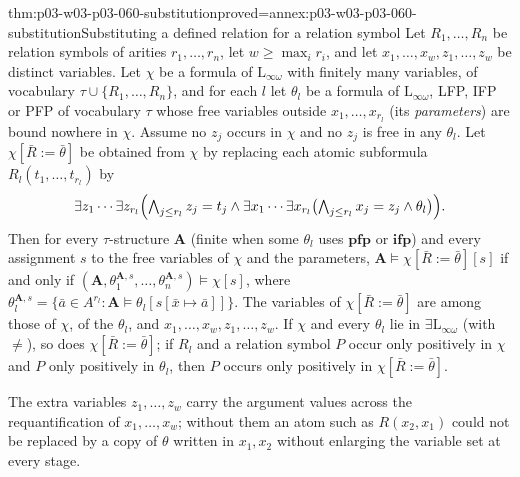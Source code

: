 \begin{hblemma}{thm:p03-w03-p03-060-substitution}{proved=annex:p03-w03-p03-060-substitution}{Substituting a defined relation for a relation symbol}
Let \(R_1,\ldots,R_n\) be relation symbols of arities \(r_1,\ldots,r_n\), let
\(w\ge\max_ir_i\), and let \(x_1,\ldots,x_w,z_1,\ldots,z_w\) be distinct
variables. Let \(\chi\) be a formula of \(\mathrm{L}_{\infty\omega}\) with
finitely many variables, of vocabulary \(\tau\cup\{R_1,\ldots,R_n\}\), and
for each \(l\) let \(\theta_l\) be a formula of \(\mathrm{L}_{\infty\omega}\),
LFP, IFP or PFP of vocabulary \(\tau\) whose free variables outside
\(x_1,\ldots,x_{r_l}\) (its \emph{parameters}) are bound nowhere in
\(\chi\). Assume no \(z_j\) occurs in \(\chi\) and no \(z_j\) is free in
any \(\theta_l\).
Let \(\chi[\bar R:=\bar\theta]\) be obtained from \(\chi\) by replacing each
atomic subformula \(R_l(t_1,\ldots,t_{r_l})\) by
\[
 \exists z_1\cdots\exists z_{r_l}\Bigl(\textstyle\bigwedge_{j\le r_l}z_j=t_j\wedge
 \exists x_1\cdots\exists x_{r_l}\bigl(\bigwedge_{j\le r_l}x_j=z_j\wedge\theta_l\bigr)\Bigr).
\]
Then for every \(\tau\)-structure \(\mathbf A\) (finite when some
\(\theta_l\) uses \(\mathbf{pfp}\) or \(\mathbf{ifp}\)) and every assignment
\(s\) to the free variables of \(\chi\) and the parameters,
\(\mathbf A\models\chi[\bar R:=\bar\theta][s]\) if and only if
\((\mathbf A,\theta_1^{\mathbf A,s},\ldots,\theta_n^{\mathbf A,s})\models\chi[s]\),
where \(\theta_l^{\mathbf A,s}=\{\bar a\in A^{r_l}:\mathbf A\models\theta_l[s[\bar x\mapsto\bar a]]\}\).
The variables of \(\chi[\bar R:=\bar\theta]\) are among those of \(\chi\),
of the \(\theta_l\), and \(x_1,\ldots,x_w,z_1,\ldots,z_w\). If \(\chi\) and
every \(\theta_l\) lie in \(\exists\mathrm{L}_{\infty\omega}\) (with
\(\neq\)), so does \(\chi[\bar R:=\bar\theta]\); if \(R_l\) and a relation
symbol \(P\) occur only positively in \(\chi\) and \(P\) only positively in
\(\theta_l\), then \(P\) occurs only positively in
\(\chi[\bar R:=\bar\theta]\).
\end{hblemma}

The extra variables \(z_1,\ldots,z_w\) carry the argument values across the
requantification of \(x_1,\ldots,x_w\); without them an atom such as
\(R(x_2,x_1)\) could not be replaced by a copy of \(\theta\) written in
\(x_1,x_2\) without enlarging the variable set at every stage.

